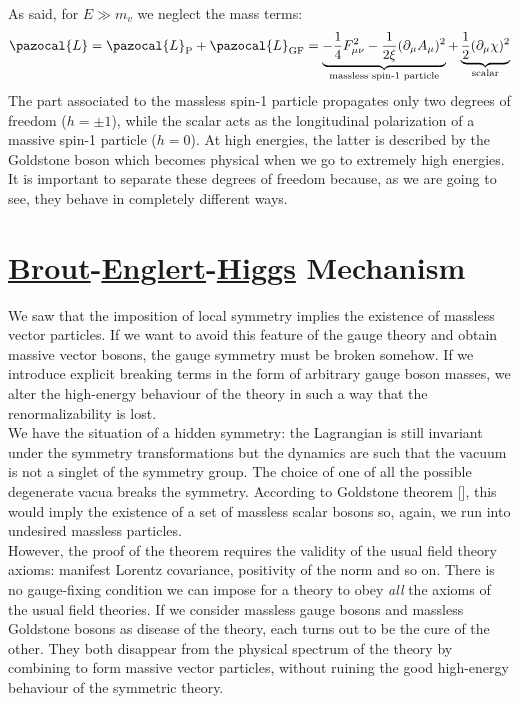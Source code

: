 \documentclass[../main.tex]{subfiles}
\begin{document}
As said, for $E\gg m_v$ we neglect the mass terms:
\[
\pazocal{L}=\pazocal{L}_{\text{P}}+\pazocal{L}_{\text{GF}}=\underbrace{-\frac{1}{4}F_{\mu\nu}^2-\frac{1}{2\xi}(\partial_\mu A_\mu)^2}_{\text{massless spin-1 particle}}+\underbrace{\frac{1}{2}(\partial_\mu \chi)^2}_{\text{scalar}}
\]
The part associated to the massless spin-1 particle propagates only two degrees of freedom ($h=\pm1$), while the scalar acts as the longitudinal polarization of a massive spin-1 particle ($h=0$). At high energies, the latter is described by the Goldstone boson which becomes physical when we go to extremely high energies. It is important to separate these degrees of freedom because, as we are going to see, they behave in completely different ways.

\section{\href{https://en.wikipedia.org/wiki/Robert_Brout}{Brout}-\href{https://en.wikipedia.org/wiki/Francois_Englert}{Englert}-\href{https://en.wikipedia.org/wiki/Peter_Higgs}{Higgs} Mechanism}
We saw that the imposition of local symmetry implies the existence of massless vector particles. If we want to avoid this feature of the gauge theory and obtain massive vector bosons, the gauge symmetry must be broken somehow. If we introduce explicit breaking terms in the form of arbitrary gauge boson masses, we alter the high-energy behaviour of the theory in such a way that the renormalizability is lost.\\
We have the situation of a hidden symmetry: the Lagrangian is still invariant under the symmetry transformations but the dynamics are such that the vacuum is not a singlet of the symmetry group. The choice of one of all the possible degenerate vacua breaks the symmetry. According to Goldstone theorem [], this would imply the existence of a set of massless scalar bosons so, again, we run into undesired massless particles.\\
However, the proof of the theorem requires the validity of the usual field theory axioms: manifest Lorentz covariance, positivity of the norm and so on. There is no gauge-fixing condition we can impose for a theory to obey \textit{all} the axioms of the usual field theories. If we consider massless gauge bosons and massless Goldstone bosons as disease of the theory, each turns out to be the cure of the other. They both disappear from the physical spectrum of the theory by combining to form massive vector particles, without ruining the good high-energy behaviour of the symmetric theory.\\
\end{document}
